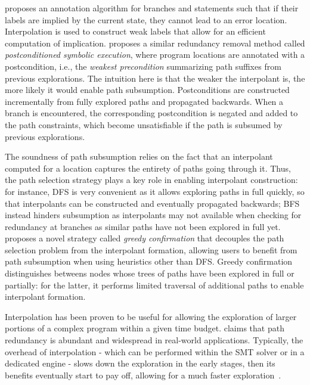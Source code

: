 {%
\cite{McMillan10} proposes an annotation algorithm for branches and statements such that if their labels are implied by the current state, they cannot lead to an error location. Interpolation is used to construct weak labels that allow for an efficient computation of implication. \cite{YYG15} proposes a similar redundancy removal method called {\em postconditioned symbolic execution}, where  program locations are annotated with a postcondition, i.e., the {\em weakest precondition} summarizing path suffixes from previous explorations. The intuition here is that the weaker the interpolant is, the more likely it would enable path subsumption. Postconditions are constructed incrementally from fully explored paths and propagated backwards. When a branch is encountered, the corresponding postcondition is negated and added to the path constraints, which become unsatisfiable if the path is subsumed by previous explorations.

The soundness of path subsumption relies on the fact that an interpolant computed for a location captures the entirety of paths going through it. Thus, the path selection strategy plays a key role in enabling interpolant construction: for instance, DFS is very convenient as it allows exploring paths in full quickly, so that interpolants can be constructed and eventually propagated backwards; BFS instead hinders subsumption as interpolants may not available when checking for redundancy at branches as similar paths have not been explored in full yet. \cite{JMN13} proposes a novel strategy called {\em greedy confirmation} that decouples the path selection problem from the interpolant formation, allowing users to benefit from path subsumption when using heuristics other than DFS. Greedy confirmation distinguishes betweens nodes whose trees of paths have been explored in full or partially: for the latter, it performs limited traversal of additional paths to enable interpolant formation.

Interpolation has been proven to be useful for allowing the exploration of larger portions of a complex program within a given time budget. \cite{YYG15} claims that path redundancy is abundant and widespread in real-world applications. Typically, the overhead of interpolation - which can be performed within the SMT solver or in a dedicated engine - slows down the exploration in the early stages, then its benefits eventually start to pay off, allowing for a much faster exploration~\cite{JMN13}. 

}
